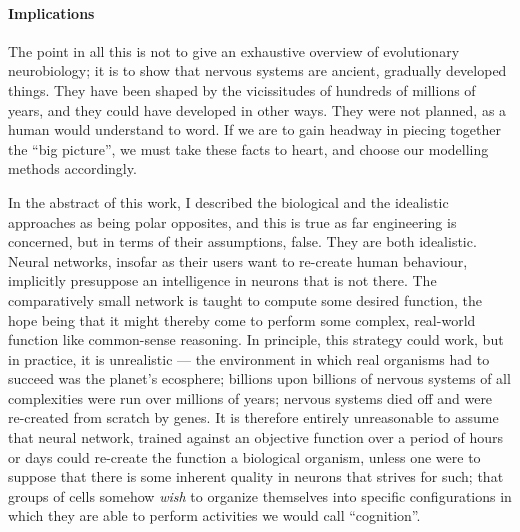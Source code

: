 

\paragraph{Implications} The point in all this is not to give an exhaustive overview of evolutionary neurobiology; it is to show that nervous systems are ancient, gradually developed things. They have been shaped by the vicissitudes of hundreds of millions of years, and they could have developed in other ways. They were not planned, as a human would understand to word. If we are to gain headway in piecing together the ``big picture'', we must take these facts to heart, and choose our modelling methods accordingly.

In the abstract of this work, I described the biological and the idealistic approaches as being polar opposites, and this is true as far engineering is concerned, but in terms of their assumptions, false. They are both idealistic. Neural networks, insofar as their users want to re-create human behaviour, implicitly presuppose an intelligence in neurons that is not there. The comparatively small network is taught to compute some desired function, the hope being that it might thereby come to perform some complex, real-world function like common-sense reasoning. In principle, this strategy could work, but in practice, it is unrealistic --- the environment in which real organisms had to succeed was the planet's ecosphere; billions upon billions of nervous systems of all complexities were run over millions of years; nervous systems died off and were re-created from scratch by genes. It is therefore entirely unreasonable to assume that neural network, trained against an objective function over a period of hours or days could re-create the function a biological organism, unless one were to suppose that there is some inherent quality in neurons that strives for such; that groups of cells somehow {\em wish} to organize themselves into specific configurations in which they are able to perform activities we would call ``cognition''. 

